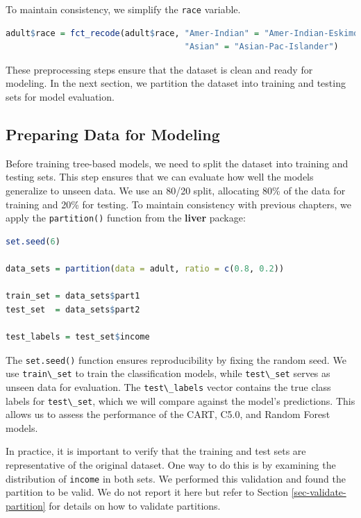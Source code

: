 \documentclass[
]{book}
\newcommand{\passthrough}[1]{#1}
\theoremstyle{definition}
\theoremstyle{definition}
\theoremstyle{definition}
\theoremstyle{definition}
\theoremstyle{remark}
\begin{document}
To maintain consistency, we simplify the \passthrough{\lstinline!race!} variable.

\begin{lstlisting}[language=R]
adult$race = fct_recode(adult$race, "Amer-Indian" = "Amer-Indian-Eskimo", 
                                    "Asian" = "Asian-Pac-Islander")
\end{lstlisting}

These preprocessing steps ensure that the dataset is clean and ready for modeling. In the next section, we partition the dataset into training and testing sets for model evaluation.

\subsection*{Preparing Data for Modeling}\label{preparing-data-for-modeling-2}

Before training tree-based models, we need to split the dataset into training and testing sets. This step ensures that we can evaluate how well the models generalize to unseen data. We use an 80/20 split, allocating 80\% of the data for training and 20\% for testing. To maintain consistency with previous chapters, we apply the \passthrough{\lstinline!partition()!} function from the \textbf{liver} package:

\begin{lstlisting}[language=R]
set.seed(6)

data_sets = partition(data = adult, ratio = c(0.8, 0.2))

train_set = data_sets$part1
test_set  = data_sets$part2

test_labels = test_set$income
\end{lstlisting}

The \passthrough{\lstinline!set.seed()!} function ensures reproducibility by fixing the random seed. We use \passthrough{\lstinline!train\_set!} to train the classification models, while \passthrough{\lstinline!test\_set!} serves as unseen data for evaluation. The \passthrough{\lstinline!test\_labels!} vector contains the true class labels for \passthrough{\lstinline!test\_set!}, which we will compare against the model's predictions. This allows us to assess the performance of the CART, C5.0, and Random Forest models.

In practice, it is important to verify that the training and test sets are representative of the original dataset. One way to do this is by examining the distribution of \passthrough{\lstinline!income!} in both sets. We performed this validation and found the partition to be valid. We do not report it here but refer to Section \ref{sec-validate-partition} for details on how to validate partitions.
\end{document}

